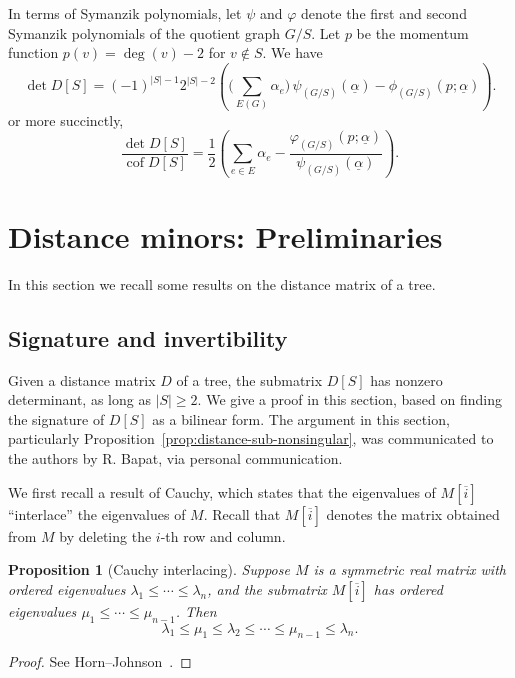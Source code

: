 \documentclass{amsart}
\newtheorem{prop}[thm]{Proposition}
\theoremstyle{definition}
\DeclareMathOperator{\cof}{cof}
\newcommand{\trees}{\mathcal{F}_1}
\newcommand{\forests}{\mathcal{F}}
\newcommand{\degout}{\deg^o}
\begin{document}
In terms of Symanzik polynomials, let $\psi$ and $\varphi$ denote the first and second Symanzik polynomials of the quotient graph $G/S$.
Let $p$ be the momentum function $p(v) = \deg(v) - 2$ for $v \not \in S$.
We have
\begin{equation}
\label{eq:det-symanzik}
	\det D[S] = (-1)^{|S|-1} 2^{|S|-2} \left( \Big(\sum_{E(G)}\alpha_e \Big)\, \psi_{(G/S)}(\underline{\alpha}) - \phi_{(G/S)}(p; \underline{\alpha}) \right).
\end{equation}
or more succinctly,
\begin{equation}
\label{eq:det-cof-symanzik}
	\frac{\det D[S]}{\cof D[S]} = \frac12 \left( \sum_{e \in E} \alpha_e - \frac{\varphi_{(G/S)}(p; \underline{\alpha})}{\psi_{(G/S)}(\underline{\alpha})} \right).
\end{equation}

\section{Distance minors: Preliminaries}

In this section we recall some results on the distance matrix of a tree.

\subsection{Signature and invertibility}

Given a distance matrix $D$ of a tree,
the submatrix $D[S]$ has nonzero determinant, as long as $|S| \geq 2$.
We give a proof in this section, based on finding the signature of $D[S]$ as a bilinear form.
The argument in this section, particularly Proposition~\ref{prop:distance-sub-nonsingular}, was communicated to the authors by R. Bapat, via personal communication.

We first recall a result of Cauchy, which states that the eigenvalues of $M[\overline{i}]$ ``interlace'' the eigenvalues of $M$.
Recall that $M[\overline{i}]$ denotes the matrix obtained from $M$ by deleting the $i$-th row and column.

\begin{prop}[Cauchy interlacing]
\label{prop:cauchy-interlacing}
Suppose $M$ is a symmetric real matrix 
with ordered eigenvalues $\lambda_1 \leq \cdots \leq \lambda_n$, 
and  the submatrix $M[\overline{i}]$ has ordered eigenvalues $\mu_1 \leq \cdots \leq \mu_{n-1}$.
Then
\[
	\lambda_1 \leq \mu_1 \leq \lambda_2 \leq \cdots \leq \mu_{n-1} \leq \lambda_n.
\]
\end{prop}
\begin{proof}
See Horn--Johnson~\cite[Theorem 4.3.17]{horn-johnson}.
\end{proof}
\end{document}
